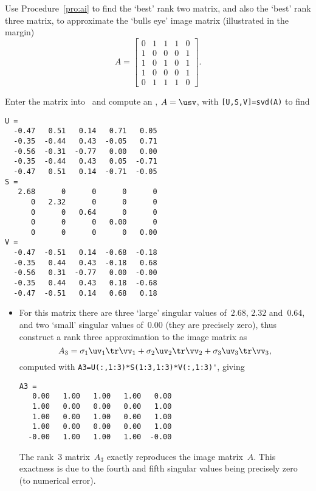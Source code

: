 \begin{example} \label{eg:bullseyemat}
Use Procedure~\ref{pro:ai} to find the `best' rank two matrix, and also the `best' rank three matrix, to approximate the `bulls eye' image matrix (illustrated in the margin)
\marginpar{}
\begin{equation*}
A=\begin{bmatrix} 0&1&1&1&0
\\1&0&0&0&1
\\1&0&1&0&1
\\1&0&0&0&1
\\0&1&1&1&0 \end{bmatrix}.
\end{equation*}
\begin{solution} 
Enter the matrix into \script\ and compute an \svd, \(A=\usv\), with \verb|[U,S,V]=svd(A)| to find \twodp
\begin{verbatim}
U =
  -0.47   0.51   0.14   0.71   0.05
  -0.35  -0.44   0.43  -0.05   0.71
  -0.56  -0.31  -0.77   0.00   0.00
  -0.35  -0.44   0.43   0.05  -0.71
  -0.47   0.51   0.14  -0.71  -0.05
S =
   2.68      0      0      0      0
      0   2.32      0      0      0
      0      0   0.64      0      0
      0      0      0   0.00      0
      0      0      0      0   0.00
V =
  -0.47  -0.51   0.14  -0.68  -0.18
  -0.35   0.44   0.43  -0.18   0.68
  -0.56   0.31  -0.77   0.00  -0.00
  -0.35   0.44   0.43   0.18  -0.68
  -0.47  -0.51   0.14   0.68   0.18
\end{verbatim}
\setbox\ajrqrbox\hbox{}%
\marginpar{\usebox{\ajrqrbox\\[2ex]}}%
\begin{itemize}
\item For this matrix there are three `large' singular values of~\(2.68\), \(2.32\) and~\(0.64\), and two `small' singular values of~\(0.00\) (they are precisely zero), thus construct a rank three approximation to the image matrix as
\begin{equation*}
A_3=\sigma_1\uv_1\tr\vv_1+\sigma_2\uv_2\tr\vv_2+\sigma_3\uv_3\tr\vv_3,
\end{equation*}
computed with \verb|A3=U(:,1:3)*S(1:3,1:3)*V(:,1:3)'|, giving \twodp
\begin{verbatim}
A3 =
   0.00   1.00   1.00   1.00   0.00
   1.00   0.00   0.00   0.00   1.00
   1.00   0.00   1.00   0.00   1.00
   1.00   0.00   0.00   0.00   1.00
  -0.00   1.00   1.00   1.00  -0.00
\end{verbatim}
The rank~3 matrix~\(A_3\) exactly reproduces the image matrix~\(A\). 
This exactness is due to the  fourth and fifth singular values being precisely zero (to numerical error).


\end{itemize}
\end{solution}
\end{example}
